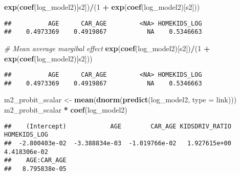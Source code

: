 \documentclass[
]{article}
\newenvironment{Shaded}{\begin{snugshade}}{\end{snugshade}}
\newcommand{\AttributeTok}[1]{\textcolor[rgb]{0.13,0.29,0.53}{#1}}
\newcommand{\CommentTok}[1]{\textcolor[rgb]{0.56,0.35,0.01}{\textit{#1}}}
\newcommand{\DecValTok}[1]{\textcolor[rgb]{0.00,0.00,0.81}{#1}}
\newcommand{\FunctionTok}[1]{\textcolor[rgb]{0.13,0.29,0.53}{\textbf{#1}}}
\newcommand{\NormalTok}[1]{#1}
\newcommand{\OtherTok}[1]{\textcolor[rgb]{0.56,0.35,0.01}{#1}}
\newcommand{\SpecialCharTok}[1]{\textcolor[rgb]{0.81,0.36,0.00}{\textbf{#1}}}
\newcommand{\StringTok}[1]{\textcolor[rgb]{0.31,0.60,0.02}{#1}}
\begin{document}
\begin{Shaded}
\begin{Highlighting}[]
\FunctionTok{exp}\NormalTok{(}\FunctionTok{coef}\NormalTok{(log\_model2)[s2])}\SpecialCharTok{/}\NormalTok{(}\DecValTok{1} \SpecialCharTok{+} \FunctionTok{exp}\NormalTok{(}\FunctionTok{coef}\NormalTok{(log\_model2)[s2]))}
\end{Highlighting}
\end{Shaded}

\begin{verbatim}
##          AGE      CAR_AGE         <NA> HOMEKIDS_LOG 
##    0.4973369    0.4919867           NA    0.5346663
\end{verbatim}

\begin{Shaded}
\begin{Highlighting}[]
\CommentTok{\# Mean average margibal effect }
\FunctionTok{exp}\NormalTok{(}\FunctionTok{coef}\NormalTok{(log\_model2)[s2])}\SpecialCharTok{/}\NormalTok{(}\DecValTok{1} \SpecialCharTok{+} \FunctionTok{exp}\NormalTok{(}\FunctionTok{coef}\NormalTok{(log\_model2)[s2]))}
\end{Highlighting}
\end{Shaded}

\begin{verbatim}
##          AGE      CAR_AGE         <NA> HOMEKIDS_LOG 
##    0.4973369    0.4919867           NA    0.5346663
\end{verbatim}

\begin{Shaded}
\begin{Highlighting}[]
\NormalTok{m2\_probit\_scalar }\OtherTok{\textless{}{-}} \FunctionTok{mean}\NormalTok{(}\FunctionTok{dnorm}\NormalTok{(}\FunctionTok{predict}\NormalTok{(log\_model2, }\AttributeTok{type =} \StringTok{\textquotesingle{}link\textquotesingle{}}\NormalTok{)))}
\NormalTok{m2\_probit\_scalar }\SpecialCharTok{*} \FunctionTok{coef}\NormalTok{(log\_model2)}
\end{Highlighting}
\end{Shaded}

\begin{verbatim}
##    (Intercept)            AGE        CAR_AGE KIDSDRIV_RATIO   HOMEKIDS_LOG 
##  -2.800403e-02  -3.388834e-03  -1.019766e-02   1.927615e+00   4.418306e-02 
##    AGE:CAR_AGE 
##   8.795838e-05
\end{verbatim}
\end{document}
